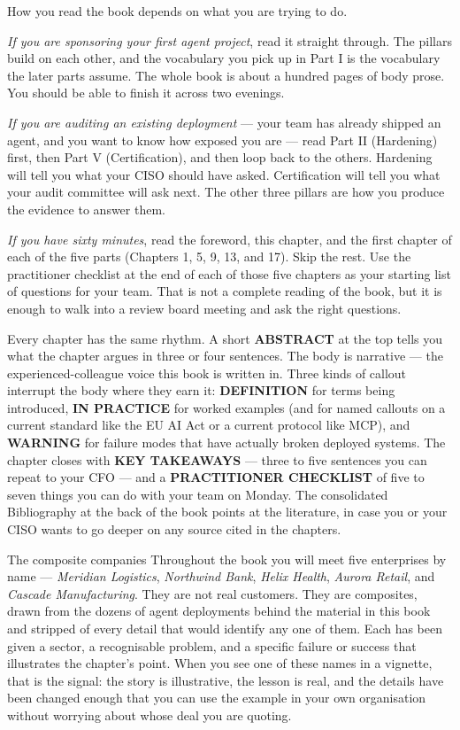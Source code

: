 How you read the book depends on what you are trying to do.

\textit{If you are sponsoring your first agent project}, read it straight through. The pillars build on each other, and the vocabulary you pick up in Part I is the vocabulary the later parts assume. The whole book is about a hundred pages of body prose. You should be able to finish it across two evenings.

\textit{If you are auditing an existing deployment} --- your team has already shipped an agent, and you want to know how exposed you are --- read Part II (Hardening) first, then Part V (Certification), and then loop back to the others. Hardening will tell you what your CISO should have asked. Certification will tell you what your audit committee will ask next. The other three pillars are how you produce the evidence to answer them.

\textit{If you have sixty minutes}, read the foreword, this chapter, and the first chapter of each of the five parts (Chapters 1, 5, 9, 13, and 17). Skip the rest. Use the practitioner checklist at the end of each of those five chapters as your starting list of questions for your team. That is not a complete reading of the book, but it is enough to walk into a review board meeting and ask the right questions.

Every chapter has the same rhythm. A short \textbf{ABSTRACT} at the top tells you what the chapter argues in three or four sentences. The body is narrative --- the experienced-colleague voice this book is written in. Three kinds of callout interrupt the body where they earn it: \textbf{DEFINITION} for terms being introduced, \textbf{IN PRACTICE} for worked examples (and for named callouts on a current standard like the EU AI Act or a current protocol like MCP), and \textbf{WARNING} for failure modes that have actually broken deployed systems. The chapter closes with \textbf{KEY TAKEAWAYS} --- three to five sentences you can repeat to your CFO --- and a \textbf{PRACTITIONER CHECKLIST} of five to seven things you can do with your team on Monday. The consolidated Bibliography at the back of the book points at the literature, in case you or your CISO wants to go deeper on any source cited in the chapters.

\begin{TNinpractice}{The composite companies}
Throughout the book you will meet five enterprises by name --- \textit{Meridian Logistics}, \textit{Northwind Bank}, \textit{Helix Health}, \textit{Aurora Retail}, and \textit{Cascade Manufacturing}. They are not real customers. They are composites, drawn from the dozens of agent deployments behind the material in this book and stripped of every detail that would identify any one of them. Each has been given a sector, a recognisable problem, and a specific failure or success that illustrates the chapter's point. When you see one of these names in a vignette, that is the signal: the story is illustrative, the lesson is real, and the details have been changed enough that you can use the example in your own organisation without worrying about whose deal you are quoting.
\end{TNinpractice}

